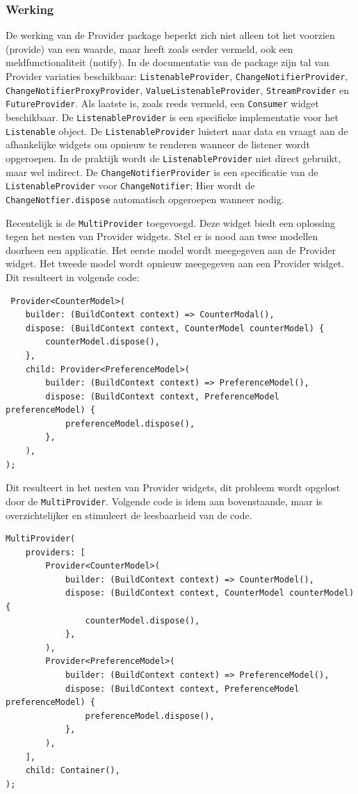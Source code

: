 \subsubsection{Werking}
De werking van de Provider package beperkt zich niet alleen tot het voorzien (provide) van een waarde, maar heeft zoals eerder vermeld, ook een meldfunctionaliteit (notify).
In de documentatie van de package zijn tal van Provider variaties beschikbaar: \verb|ListenableProvider|, \verb|ChangeNotifierProvider|, \verb|ChangeNotifierProxyProvider|, \verb|ValueListenableProvider|, \verb|StreamProvider| en \verb|FutureProvider|. Als laatste is, zoals reeds vermeld, een \verb|Consumer| widget beschikbaar.
De \verb|ListenableProvider| is een specifieke implementatie voor het \verb|Listenable| object. De \verb|ListenableProvider| luistert naar data en vraagt aan de afhankelijke widgets om opnieuw te renderen wanneer de listener wordt opgeroepen. In de praktijk wordt de \verb|ListenableProvider| niet direct gebruikt, maar wel indirect. De \verb|ChangeNotifierProvider| is een specificatie van de \verb|ListenableProvider| voor \verb|ChangeNotifier|; Hier wordt de \verb|ChangeNotfier.dispose| automatisch opgeroepen wanneer nodig.

Recentelijk is de \verb|MultiProvider| toegevoegd. Deze widget biedt een oplossing tegen het nesten van Provider widgets. Stel er is nood aan twee modellen doorheen een applicatie. Het eerste model wordt meegegeven aan de Provider widget. Het tweede model wordt opnieuw meegegeven aan een Provider widget. Dit resulteert in volgende code:
 \begin{verbatim}
 Provider<CounterModel>(
    builder: (BuildContext context) => CounterModal(),
    dispose: (BuildContext context, CounterModel counterModel) {
        counterModel.dispose(),
    },
    child: Provider<PreferenceModel>(
        builder: (BuildContext context) => PreferenceModel(),
        dispose: (BuildContext context, PreferenceModel preferenceModel) {
            preferenceModel.dispose(),
        },
    ),
);
\end{verbatim}
Dit resulteert in het nesten van Provider widgets, dit probleem wordt opgelost door de \verb|MultiProvider|. Volgende code is idem aan bovenstaande, maar is overzichtelijker en stimuleert de leesbaarheid van de code.
 \begin{verbatim}
MultiProvider(
    providers: [
        Provider<CounterModel>(
            builder: (BuildContext context) => CounterModel(),
            dispose: (BuildContext context, CounterModel counterModel) {
                counterModel.dispose(),
            },
        ),
        Provider<PreferenceModel>(
            builder: (BuildContext context) => PreferenceModel(),
            dispose: (BuildContext context, PreferenceModel preferenceModel) {
                preferenceModel.dispose(),
            },
        ),
    ],
    child: Container(),
);

\end{verbatim}

